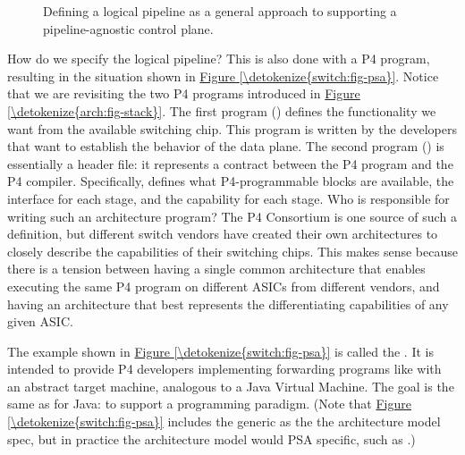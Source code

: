 \documentclass[letterpaper,11pt,english]{sphinxmanual}
\let\sphinxpxdimen\pdfpxdimen\else\newdimen\sphinxpxdimen
\begin{document}
\begin{figure}[htbp]
\centering
\capstart

\noindent\sphinxincludegraphics[width=600\sphinxpxdimen]{{Slide16}.png}
\caption{Defining a logical pipeline as a general approach to supporting a
pipeline-agnostic control plane.}\label{\detokenize{switch:id12}}\label{\detokenize{switch:fig-logical}}\end{figure}

How do we specify the logical pipeline? This is also done with a P4
program, resulting in the situation shown in \hyperref[\detokenize{switch:fig-psa}]{Figure \ref{\detokenize{switch:fig-psa}}}. Notice that we are revisiting the two P4 programs
introduced in \hyperref[\detokenize{arch:fig-stack}]{Figure \ref{\detokenize{arch:fig-stack}}}. The first program
() defines the functionality we want from the available
switching chip. This program is written by the developers that want to
establish the behavior of the data plane. The second program
() is essentially a header file: it represents a contract
between the P4 program and the P4 compiler. Specifically, 
defines what P4-programmable blocks are available, the interface for
each stage, and the capability for each stage. Who is responsible for
writing such an architecture program? The P4 Consortium is one source
of such a definition, but different switch vendors have created their
own architectures to closely describe the capabilities of their
switching chips. This makes sense because there is a tension between
having a single common architecture that enables executing the same P4
program on different ASICs from different vendors, and having an
architecture that best represents the differentiating capabilities of
any given ASIC.

The example shown in \hyperref[\detokenize{switch:fig-psa}]{Figure \ref{\detokenize{switch:fig-psa}}} is called the
. It is intended to provide P4
developers implementing forwarding programs like  with
an abstract target machine, analogous to a Java Virtual Machine. The
goal is the same as for Java: to support a 
programming paradigm. (Note that \hyperref[\detokenize{switch:fig-psa}]{Figure \ref{\detokenize{switch:fig-psa}}}
includes the generic  as the the architecture model spec,
but in practice the architecture model would PSA specific, such as
.)
\end{document}
